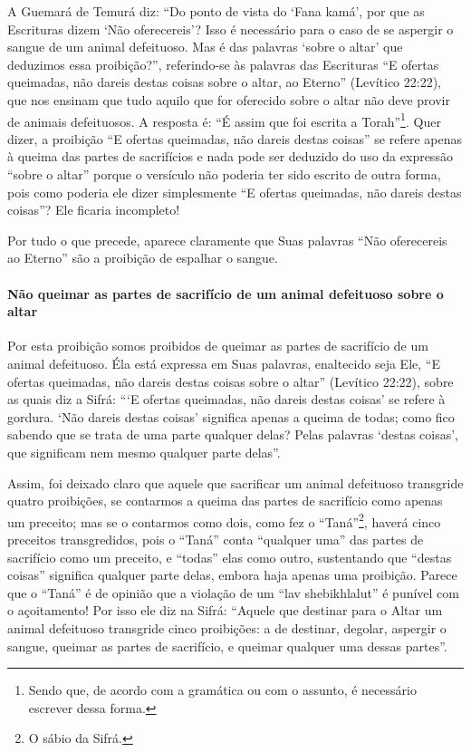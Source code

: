 A Guemará de Temurá diz: ``Do ponto de vista do `Fana
kamá', por que as Escrituras dizem `Não oferecereis'? Isso é necessário
para o caso de se aspergir o sangue de um animal defeituoso. Mas é das
palavras `sobre o altar' que deduzimos essa proibição?'', referindo-se
às palavras das Escrituras ``E ofertas queimadas, não dareis destas
coisas sobre o altar, ao Eterno'' (Levítico 22:22), que nos ensinam que
tudo aquilo que for oferecido sobre o altar não deve provir de animais
defeituosos. A resposta é: ``É assim que foi escrita a
Torah''\footnote{Sendo que, de acordo com a gramática ou com o assunto, é necessário
  escrever dessa forma.}. Quer dizer, a proibição ``E ofertas
queimadas, não dareis destas coisas'' se refere apenas à queima das
partes de sacrifícios e nada pode ser deduzido do uso da expressão
``sobre o altar'' porque o versículo não poderia ter sido escrito de
outra forma, pois como poderia ele dizer simplesmente ``E ofertas
queimadas, não dareis destas coisas''? Ele ficaria incompleto!

Por tudo o que precede, aparece claramente que Suas palavras ``Não
oferecereis ao Eterno'' são a proibição de espalhar o sangue.

\paragraph{Não queimar as partes de sacrifício de um animal defeituoso sobre o altar}

Por esta proibição somos proibidos de queimar as partes de sacrifício
de um animal defeituoso. Éla está expressa em Suas palavras, enaltecido
seja Ele, ``E ofertas queimadas, não dareis destas coisas sobre o
altar'' (Levítico 22:22), sobre as quais diz a Sifrá: ```E ofertas
queimadas, não dareis destas coisas' se refere à gordura. `Não dareis
destas coisas' significa apenas a queima de todas; como fico sabendo que
se trata de uma parte qualquer delas? Pelas palavras `destas coisas',
que significam nem mesmo qualquer parte delas''.

Assim, foi deixado claro que aquele que sacrificar um animal defeituoso
transgride quatro proibições, se contarmos a queima das partes de
sacrifício como apenas um preceito; mas se o contarmos como dois, como
fez o ``Taná''\footnote{O sábio da Sifrá.}, haverá cinco preceitos
transgredidos, pois o ``Taná'' conta ``qualquer uma'' das partes de
sacrifício como um preceito, e ``todas'' elas como outro, sustentando
que ``destas coisas'' significa qualquer parte delas, embora haja
apenas uma proibição. Parece que o ``Taná'' é de opinião que a violação
de um ``lav shebikhlalut'' é punível com o açoitamento! Por isso ele diz na
Sifrá: ``Aquele que destinar para o Altar um animal defeituoso
transgride cinco proibições: a de destinar, degolar, aspergir o sangue,
queimar as partes de sacrifício, e queimar qualquer uma dessas
partes''.

